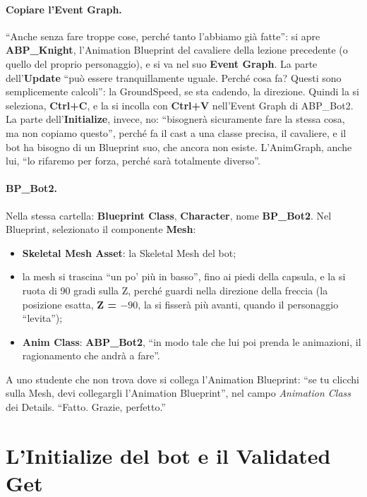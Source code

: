 \paragraph{Copiare l'Event Graph.} ``Anche senza fare troppe cose, perché tanto l'abbiamo
già fatte'': si apre \textbf{ABP\_Knight}, l'Animation Blueprint del cavaliere della
lezione precedente (o quello del proprio personaggio), e si va nel suo \textbf{Event
Graph}. La parte dell'\textbf{Update} ``può essere tranquillamente uguale. Perché cosa
fa? Questi sono semplicemente calcoli'': la GroundSpeed, se sta cadendo, la direzione.
Quindi la si seleziona, \textbf{Ctrl+C}, e la si incolla con \textbf{Ctrl+V} nell'Event
Graph di ABP\_Bot2. La parte dell'\textbf{Initialize}, invece, no: ``bisognerà sicuramente
fare la stessa cosa, ma non copiamo questo'', perché fa il cast a una classe precisa, il
cavaliere, e il bot ha bisogno di un Blueprint suo, che ancora non esiste. L'AnimGraph,
anche lui, ``lo rifaremo per forza, perché sarà totalmente diverso''.

\paragraph{BP\_Bot2.} Nella stessa cartella: \textbf{Blueprint Class}, \textbf{Character},
nome \textbf{BP\_Bot2}. Nel Blueprint, selezionato il componente \textbf{Mesh}:
\begin{itemize}
  \item \textbf{Skeletal Mesh Asset}: la Skeletal Mesh del bot;
  \item la mesh si trascina ``un po' più in basso'', fino ai piedi della capsula, e la si
        ruota di 90 gradi sulla Z, perché guardi nella direzione della freccia (la
        posizione esatta, \textbf{Z = $-90$}, la si fisserà più avanti, quando il
        personaggio ``levita'');
  \item \textbf{Anim Class}: \textbf{ABP\_Bot2}, ``in modo tale che lui poi prenda le
        animazioni, il ragionamento che andrà a fare''.
\end{itemize}
A uno studente che non trova dove si collega l'Animation Blueprint: ``se tu clicchi
sulla Mesh, devi collegargli l'Animation Blueprint'', nel campo \emph{Animation Class}
dei Details. ``Fatto. Grazie, perfetto.''

\section{L'Initialize del bot e il Validated Get}
\label{ue10:sec:initialize}

